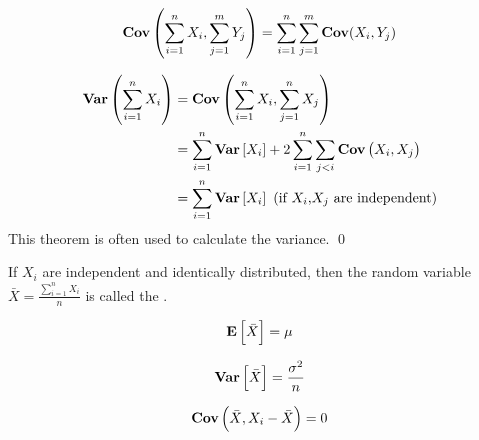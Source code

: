 \begin{theorem}
    \begin{equation}
        \mathop{\bf Cov\/} \left(\sum_{i=1}^n X_i, \sum_{j=1}^m Y_j \right) = \sum_{i=1}^n \sum_{j=1}^m \mathop{\bf Cov\/}(X_i, Y_j)
    \end{equation}    
\end{theorem}

\begin{theorem}
    \begin{equation}
    \begin{aligned}
        \mathop{\bf Var\/} \left( \sum_{i=1}^n X_i \right) &= \mathop{\bf Cov\/}\left( \sum_{i=1}^n X_i, \sum_{j=1}^n X_j \right) \\
        &= \sum_{i=1}^n \mathop{\bf Var\/}\displaystyle \left[ X_i \right] + 2 \sum_{i=1}^n \sum_{j < i} \mathop{\bf Cov\/}\displaystyle \left(X_i,X_j \right) \\
        &= \sum_{i=1}^n \mathop{\bf Var\/}\displaystyle \left[ X_i \right] \text{ (if } X_i \text{,} X_j \text{ are independent)}
    \end{aligned}
    \end{equation}
    This theorem is often used to calculate the variance. \qed
\end{theorem}

\begin{definition}
    If $X_i$ are independent and identically distributed, then the random variable $\bar{X} =\displaystyle \frac{\sum_{i=1}^n X_i}{n}$ is called the .
\end{definition}

\begin{theorem}
\begin{equation}
    \mathop{\bf E\/}\displaystyle \left[ \bar{X} \right] = \mu
\end{equation}    
\end{theorem}

\begin{theorem}
\begin{equation}
    \mathop{\bf Var\/}\displaystyle \left[ \bar{X} \right] = \frac{\sigma^2}{n}
\end{equation}    
\end{theorem}
\begin{theorem}
\begin{equation}
    \mathop{\bf Cov\/}\displaystyle \left(\bar{X},X_i - \bar{X} \right) = 0
\end{equation}    
\end{theorem}

